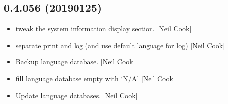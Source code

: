\documentclass[a4paper,10pt,english]{report}
\begin{document}
\subsection{0.4.056 (2019\sphinxhyphen{}01\sphinxhyphen{}25)}
\label{\detokenize{misc/changelog:id226}}\begin{itemize}
\item {} 
 \sphinxhyphen{} tweak the system information display section. {[}Neil
Cook{]}

\item {} 
 \sphinxhyphen{} separate print and log (and use default language for log)
{[}Neil Cook{]}

\item {} 
Backup language database. {[}Neil Cook{]}

\item {} 
 \sphinxhyphen{} fill language database empty with ‘N/A’ {[}Neil Cook{]}

\item {} 
Update language databases. {[}Neil Cook{]}

\end{itemize}
\end{document}
